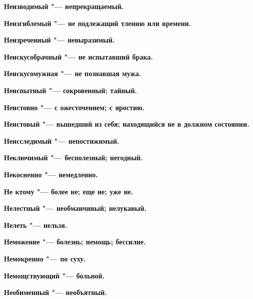 \begin{mymulticols}{2}
\bfseries Неизводимый\normalfont{} "--- непрекращаемый. 




\bfseries Неизгиблемый\normalfont{} "--- не подлежащий тлению или времени. 




\bfseries Неизреченный\normalfont{} "--- невыразимый. 




\bfseries Неискусобрачный\normalfont{} "--- не испытавший брака. 




\bfseries Неискусомужная\normalfont{} "--- не познавшая мужа. 




\bfseries Неиспытный\normalfont{} "--- сокровенный; тайный. 




\bfseries Неистовно\normalfont{} "--- с ожесточением; с яростию. 




\bfseries Неистовый\normalfont{} "--- вышедший из себя; находящийся не в должном состоянии. 




\bfseries Неисследимый\normalfont{} "--- непостижимый. 




\bfseries Неключимый\normalfont{} "--- бесполезный; негодный. 




\bfseries Некосненно\normalfont{} "--- немедленно. 




\bfseries Не ктому\normalfont{} "--- более не; еще не; уже не. 




\bfseries Нелестный\normalfont{} "--- необманчивый; нелукавый. 




\bfseries Нелеть\normalfont{} "--- нельзя. 




\bfseries Неможение\normalfont{} "--- болезнь; немощь; бессилие. 




\bfseries Немокренно\normalfont{} "--- по суху. 




\bfseries Немощствующий\normalfont{} "--- больной. 




\bfseries Необименный\normalfont{} "--- необъятный. 





\end{mymulticols}

